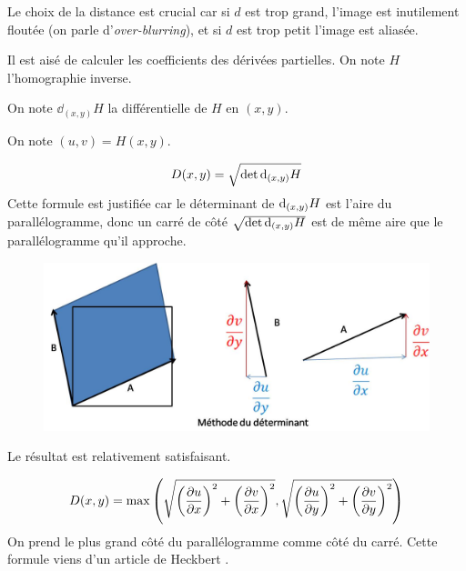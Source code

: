 Le choix de la distance est crucial car si $d$ est trop grand, l'image est inutilement floutée (on parle d'\emph{over-blurring}), et si $d$ est trop petit l'image est aliasée.

Il est aisé de calculer les coefficients des dérivées partielles. On note $H$ l'homographie inverse.



On note $\dd_{(x,y)} H$ la différentielle de $H$ en $(x,y)$.

On note $(u,v)=H(x,y)$.

$$D(x,y) = \sqrt{\det \textrm{d}_{(x,y)} H}$$
Cette formule est justifiée car le déterminant de $\textrm{d}_{(x,y)} H$ est l'aire du parallélogramme, donc un carré de côté $\sqrt{\det \textrm{d}_{(x,y)} H}$ est de même aire que le parallélogramme qu'il approche.

\begin{figure}[h!]
\centering
\includegraphics[scale=0.5]{methode_determinant.jpg}
\end{figure}


Le résultat est relativement satisfaisant.


$$ D(x,y) = \max \left(\sqrt{\left(\frac{\partial u}{\partial x}\right)^2 + \left(\frac{\partial v}{\partial x}\right)^2},\sqrt{\left(\frac{\partial u}{\partial y}\right)^2 + \left(\frac{\partial v}{\partial y}\right)^2}\right)$$
On prend le plus grand côté du parallélogramme comme côté du carré. Cette formule viens d'un article de Heckbert \cite{heckbert1983texture}.

